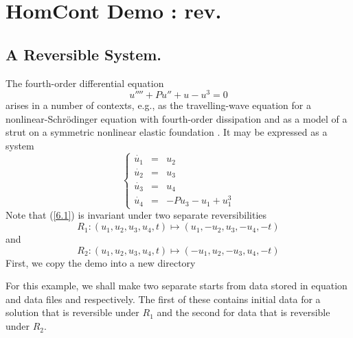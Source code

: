 \documentclass[12pt]{report}
\begin{document}
\chapter{ {\cal HomCont} Demo : rev.} \label{ch:HomCont_rev}

\section{ A Reversible System.}
The fourth-order differential equation
$$
u'''' + P u'' + u -u^3 =0
$$
arises in a number of contexts, e.g., as the travelling-wave
equation for a nonlinear-Schr\"{o}dinger equation with fourth-order
dissipation \cite{BuAk:95} and as a model of a strut on a symmetric 
nonlinear elastic foundation \cite{HuBoTh:89}. It may be expressed as
a system
\begin{equation}
\left \{ 
\begin{array}{rcl}
\dot{u_1} & = & u_2 \\
\dot{u_2} & = & u_3 \\
\dot{u_3} & = & u_4 \\
\dot{u_4} & = & -P u_3 - u_1 + u_1^3
\end{array}
\right.  
\label{6.1}
\end{equation}
Note that (\ref{6.1}) is invariant under two separate reversibilities
\begin{equation}
R_1: (u_1,u_2,u_3,u_4,t) \mapsto (u_1,-u_2,u_3,-u_4,-t)  
\label{6.R1}
\end{equation}
and 
\begin{equation}
R_2: (u_1,u_2,u_3,u_4,t) \mapsto (-u_1,u_2,-u_3,u_4,-t)  
\label{6.R2}
\end{equation}
First, we copy the demo into a new directory 
\begin{center}
\end{center}
For this example, we shall make two separate starts
from data stored in equation and data files  and  respectively. The first
of these contains initial data for a solution that is reversible
under $R_1$ and the second for data that is reversible under $R_2$. 
%
\end{document}
